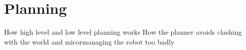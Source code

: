 \section{Planning}
How high level and low level planning works
How the planner avoids clashing with the world and micormanaging the robot too badly